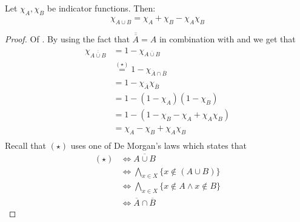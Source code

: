 \begin{thm}\label{thm-cup-indicator-function}
    Let $\chi_A,\chi_B$ be indicator functions. Then:
    \begin{equation*}
        \chi_{A \cup B} = \chi_A + \chi_B - \chi_A\chi_B
    \end{equation*}
\end{thm}

\begin{proof}
    Of .
    By using the fact that $\overline{\overline{A}}=A$ in combination with 
     and
     we get that
    \begin{align*}
        \chi_{\overline{\overline{A \cup B}}} 
        &= 1 - \chi_{\overline{A \cup B}}\\
        &\overset{(\star)}{=} 1 - \chi_{\overline{A} \cap \overline{B}}\\
        &= 1 - \chi_{\overline{A}} \chi_{\overline{B}}\\
        &= 1 - (1 - \chi_A)(1 - \chi_B)\\
        &= 1 - \left(1 - \chi_B - \chi_A + \chi_A\chi_B\right)\\
        &= \chi_A - \chi_B + \chi_A\chi_B\\
    \end{align*}
    Recall that $(\star)$ uses one of De Morgan's laws which states that
    \begin{align*}
        (\star) &\iff \overline{A \cup B}\\
                &\iff \bigwedge_{x\in X}\{x\notin (A\cup B)\}\\
                &\iff \bigwedge_{x\in X}\{x\notin A \land x\notin B\}\\
                &\iff \overline{A} \cap \overline{B}
    \end{align*}
\end{proof}